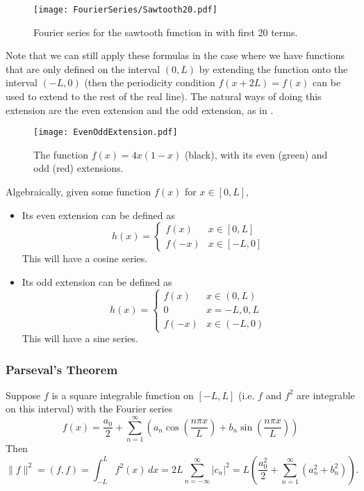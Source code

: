 \begin{figure}[!ht]
	\centering
	\texttt{[image: FourierSeries/Sawtooth20.pdf]}
	\caption{Fourier series for the sawtooth function in  with first 20 terms.}
	\label{fig:fouriersawtooth}
\end{figure}

Note that we can still apply these formulas in the case where we have functions that are only defined on the interval $(0,L)$ by extending the function onto the interval $(-L,0)$ (then the periodicity condition $f(x+2L)=f(x)$ can be used to extend to the rest of the real line). The natural ways of doing this extension are the even extension and the odd extension, as in .

\begin{figure}[!ht]
	\centering
	\texttt{[image: EvenOddExtension.pdf]}
	\caption{The function $f(x) = 4x(1-x)$ (black), with its even (green) and odd (red) extensions.}
	\label{fig:evenoddextension}
\end{figure}

Algebraically, given some function $f(x)$ for $x \in [0,L]$,
\begin{itemize}
	\item Its even extension can be defined as
	\[
		h(x) = \begin{cases}
			f(x) & x \in [0,L] \\
			f(-x) & x \in [-L,0]
		\end{cases}
	\]
	This will have a cosine series.
	\item Its odd extension can be defined as
	\[
	h(x) = \begin{cases}
		f(x) & x \in (0,L) \\
		0 & x = -L,0,L \\
		f(-x) & x \in (-L,0)
	\end{cases}
	\]
	This will have a sine series.
\end{itemize}

\subsubsection{Parseval's Theorem}

\begin{theorem}\label{thrm:parseval}
	Suppose $f$ is a square integrable function on $[-L,L]$ (i.e. $f$ and $f^2$ are integrable on this interval) with the Fourier series
	\[
	f(x) = \frac{a_0}{2} + \sum_{n=1}^{\infty} \left(a_n \cos{\left(\frac{n\pi x}{L}\right)} + b_n \sin{\left(\frac{n\pi x}{L}\right)}\right)
	\]
	Then
	\[
	\lVert f\rVert^2 = (f,f) = \int_{-L}^L f^2(x) \,dx = 2L\sum_{n=-\infty}^{\infty} |c_n|^2 = L\left(\frac{a_0^2}{2} + \sum_{n=1}^{\infty}(a_n^2 + b_n^2)\right).
	\]
\end{theorem}

